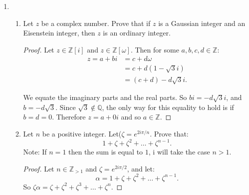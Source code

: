 \documentclass{article}
\begin{document}
\begin{enumerate}
\begin{proof}
    Consider: 
    \begin{align*}
    n!y=n!\left( \frac{1}{(n+1)!} +\frac{1}{(n+2)!}+\ldots\right) \\
    &=\frac{1}{(n+1)} +\frac{1}{(n+2)(n+1)}+\ldots\\
    &\le \frac{1}{n+1}+\frac{1}{(n+1)^2}\ldots \\
    .\end{align*}
     
    Comparing this to the geometric series $a_n=\left(  \frac{1}{3}^{n} \right)$, 
    since $n\ge2$ (if $n=1$, $e$ is an integer),
    we get
    $n!y\le \frac{1}{3}+\frac{1}{3^2}+\ldots$.

    Using the formula for the sum of an infinite geometric series,
    $S=\frac{1}{1-r}$, we know that this sum must be less than $\frac{1}{2}$. 
    So we have reached our contradiction.

\end{proof}
\item
\begin{enumerate}[label= (\alph*)] 
    \item Let $z$ be a complex number. Prove that if $z$ is a Gaussian integer
    and an Eisenstein integer, then $z$ is an ordinary integer. 
    \begin{proof} 
        Let $z\in \mathbb{Z}[i]$ and $z\in \mathbb{Z}[\omega]$. Then for some 
        $a,b,c,d\in \mathbb{Z}$:
        \begin{align*}
            z=a+bi&=c+d\omega\\
            &= c+d(1-\sqrt{3} i)\\
            &= (c+d) -d\sqrt{3} i
        .\end{align*}

        We equate the imaginary parts and the real parts. So 
        $bi=-d\sqrt{3} i$, and $b=-d\sqrt{3} $. Since $\sqrt{3}\not \in\mathbb{Q}$,
        the only way for this equality to hold is if $b=d=0$. Therefore
        $z=a+0i$ and so $a\in \mathbb{Z}$.
    \end{proof}
    \item  Let $n$ be a positive integer. Let($\zeta= e^{2i\pi/n}$. Prove that:
     \[
        1+\zeta+\zeta^2+\ldots+\zeta^{n-1}
        .\] 
        Note: If $n=1$ then the sum is equal to $1$, i will take the case 
        $n>1$.
        \begin{proof} 
            Let $n\in \mathbb{Z}_{>1}$ and $\zeta=e^{2i\pi /2}$, and let: 
            \[
            \alpha=1+\zeta+\zeta^2+\ldots+\zeta^{n-1}
            .\] 
            So $\zeta\alpha=\zeta+\zeta^2+\zeta^3+\ldots+\zeta^{n}$.


\end{proof}
\end{enumerate}
\end{enumerate}
\end{document}
